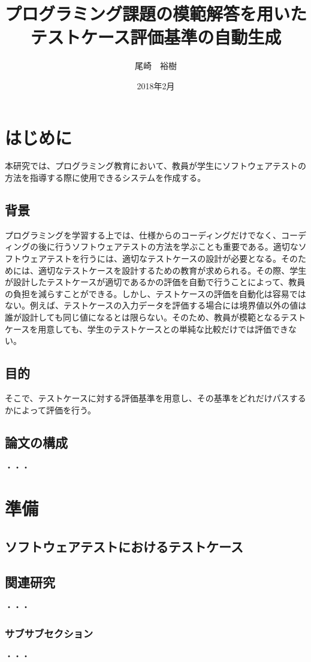 \documentclass{tpu-sotu}
\author{尾崎　裕樹}
\title{プログラミング課題の模範解答を用いた\\テストケース評価基準の自動生成}
\date{2018年2月}
\begin{document}
%
\maketitle
\clearpage
{}
\tableofcontents
\clearpage
{}
%

%
\chapter{はじめに}
本研究では、プログラミング教育において、教員が学生にソフトウェアテストの方法を指導する際に使用できるシステムを作成する。
\section{背景}
プログラミングを学習する上では、仕様からのコーディングだけでなく、コーディングの後に行うソフトウェアテストの方法を学ぶことも重要である。適切なソフトウェアテストを行うには、適切なテストケースの設計が必要となる。そのためには、適切なテストケースを設計するための教育が求められる。その際、学生が設計したテストケースが適切であるかの評価を自動で行うことによって、教員の負担を減らすことができる。しかし、テストケースの評価を自動化は容易ではない。例えば、テストケースの入力データを評価する場合には境界値以外の値は誰が設計しても同じ値になるとは限らない。そのため、教員が模範となるテストケースを用意しても、学生のテストケースとの単純な比較だけでは評価できない。
\section{目的}
そこで、テストケースに対する評価基準を用意し、その基準をどれだけパスするかによって評価を行う。
\section{論文の構成}
  ・・・
\chapter{準備}
\section{ソフトウェアテストにおけるテストケース}
\section{関連研究}
  ・・・
\subsection{サブサブセクション}
  ・・・
\end{document}
